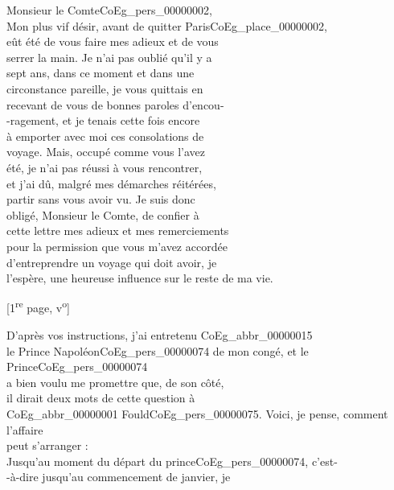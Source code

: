 \documentclass{book}
\begin{document}
{\hspace{1cm} Monsieur le Comte\gls{CoEg_pers_00000002},\\

Mon plus vif désir, avant de quitter Paris\gls{CoEg_place_00000002},\\
eût été de vous faire mes adieux et de vous\\
serrer la main. Je n’ai pas oublié qu'il y a\\
sept ans, dans ce moment et dans une\\
circonstance pareille, je vous quittais en\\
recevant de vous de bonnes paroles d’encou-\\
-ragement, et je tenais cette fois encore\\
à emporter avec moi ces consolations de\\
voyage. Mais, occupé comme vous l’avez\\
été, je n’ai pas réussi à vous rencontrer,\\
et j’ai dû, malgré mes démarches réitérées,\\
partir sans vous avoir vu. Je suis donc\\
obligé, Monsieur le Comte, de confier à\\
cette lettre mes adieux et mes remerciements\\
pour la permission que vous m’avez accordée\\
d’entreprendre un voyage qui doit avoir, je\\
l’espère, une heureuse influence sur le reste de ma vie.
{\footnotesize\begin{center} {[1\textsuperscript{re} page, v\textsuperscript{o}]}\end{center}}
\indent D’après vos instructions, j’ai entretenu \gls{CoEg_abbr_00000015}\\
le Prince Napoléon\gls{CoEg_pers_00000074} de mon congé, et le Prince\gls{CoEg_pers_00000074}\\
a bien voulu me promettre que, de son côté,\\
il dirait deux mots de cette question à\\
\gls{CoEg_abbr_00000001} Fould\gls{CoEg_pers_00000075}. Voici, je pense, comment l’affaire\\
peut s’arranger :\\
\indent Jusqu’au moment du départ du prince\gls{CoEg_pers_00000074}, c’est-\\
-à-dire jusqu’au commencement de janvier, je\\
}
\end{document}
